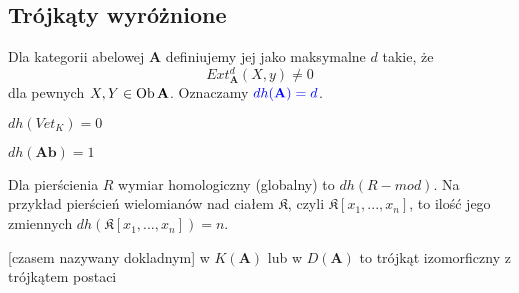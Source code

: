 \subsection{Trójkąty wyróżnione}

\begin{definition}
  Dla kategorii abelowej $\mathbf{A}$ definiujemy jej  jako maksymalne $d$ takie, że 
  $$Ext_{\mathbf{A}}^d(X, y)\neq0 $$
  dla pewnych $X,Y\in\operatorname{Ob}\mathbf{A}$. Oznaczamy $\color{blue}dh(\mathbf{A})=d$.
\end{definition}

\begin{example}
\item $dh(Vet_K)=0$
\item $dh(\mathbf{Ab})=1$
\item Dla pierścienia $R$ wymiar homologiczny (globalny) to $dh(R-mod)$. Na przykład pierścień wielomianów nad ciałem $\mathfrak{K}$, czyli $\mathfrak{K}[x_1,...,x_n]$, to ilość jego zmiennych $dh(\mathfrak{K}[x_1,..., x_n])=n$.
\end{example}

\begin{definition}
   [czasem nazywany dokladnym] w $K(\mathbf{A})$ lub w $D(\mathbf{A})$ to trójkąt izomorficzny z trójkątem postaci
  \begin{center}\end{center}
\end{definition}

